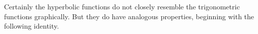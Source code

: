 % 

Certainly the hyperbolic functions do not closely resemble the
trigonometric functions graphically. But they do have analogous
properties, beginning with the following identity.


